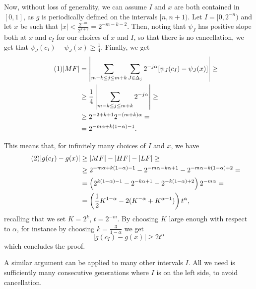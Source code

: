 \documentclass[11pt, twoside, leqno]{article}
\numberwithin{equation}{section}
\newcommand\numberthis{\addtocounter{equation}{1}\tag{\theequation}}
\theoremstyle{plain}
\theoremstyle{definition}
\begin{document}
Now, without loss of generality, we can assume $I$ and $x$ are both contained in $[0,1]$, as $g$ is periodically defined on the intervals $[n,n+1)$. Let $I=[0,2^{-n})$ and let $x$ be such that $|x| < \frac{2^{-m}}{2^{k+2}}=2^{-m-k-2}$. Then, noting that $\psi_J$ has positive slope both at $x$ and $c_I$ for our choices of $x$ and $I$, so that there is no cancellation, we get that $\psi_J(c_I)-\psi_J(x) \geq \frac14$. Finally, we get
\begin{align*} \numberthis
|MF| & = \left|\sum_{m-k\leq j \leq m+k} \sum_{J \in \Delta_j} 2^{-j\alpha}[\psi_J(c_I)-\psi_J(x)]\right| \geq \\
& \geq \frac14 \left|\sum_{m-k\leq j \leq m+k} 2^{-j\alpha}\right| \geq \\
& \geq  2^{-2 + k + 1} 2^{-(m+k)\alpha}= \\
& =2^{-m\alpha +k(1-\alpha)-1}.
\end{align*}


This means that, for infinitely many choices of $I$ and $x$, we have
\begin{align*} \numberthis
|g(c_I)-g(x)| & \geq |MF| - |HF| - |LF| \geq \\
&\geq 2^{-m\alpha +k(1-\alpha)-1}-2^{-m\alpha - k \alpha +1} - 2^{-m\alpha - k(1-\alpha) +2 } = \\
& = \left(2^{k(1-\alpha)-1}-2^{- k \alpha +1} - 2^{- k(1-\alpha) +2 }\right)2^{-m\alpha} = \\
& = \left(\frac12 K^{1-\alpha} - 2(K^{-\alpha}+K^{\alpha-1})\right)t^{\alpha},
\end{align*}
recalling that we set $K=2^k$, $t=2^{-m}$.
By choosing $K$ large enough with respect to $\alpha$, for instance by choosing $k =\frac{3}{1-\alpha}$ we get
\begin{equation}
|g(c_I)-g(x)|\geq 2 t^{\alpha}
\end{equation}
which concludes the proof. 


A similar argument can be applied to many other intervals $I$. All we need is sufficiently many consecutive generations where $I$ is on the left side, to avoid cancellation. %
\end{document}
